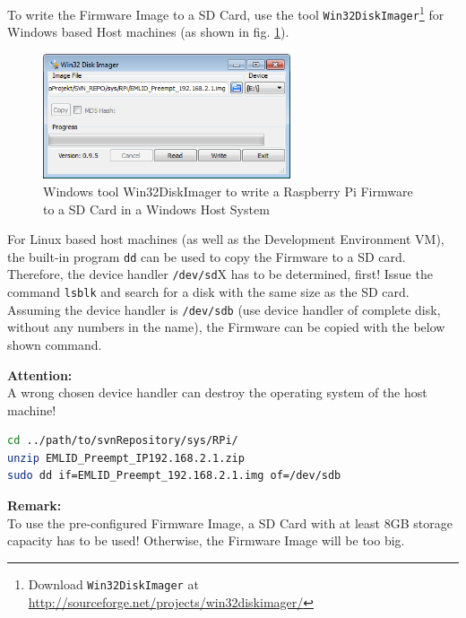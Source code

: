 To write the Firmware Image to a SD Card, use the tool \texttt{Win32DiskImager}\footnote{Download \texttt{Win32DiskImager} at \url{http://sourceforge.net/projects/win32diskimager/}} for Windows based Host machines (as shown in fig. \ref{fig:OS:win32DiskImager}).
\begin{figure}[H]
    \centering
    \includegraphics[width=0.65\textwidth]{fig/ch-rt-linux-os/Win32DiskImager}
    \caption[Windows tool Win32DiskImager]{Windows tool Win32DiskImager to write a Raspberry Pi Firmware to a SD Card in a Windows Host System}
    \label{fig:OS:win32DiskImager}
\end{figure}

For Linux based host machines (as well as the Development Environment VM), the built-in program \texttt{dd} can be used to copy the Firmware to a SD card. Therefore, the device handler \texttt{/dev/sd}X has to be determined, first! Issue the command \texttt{lsblk} and search for a disk with the same size as the SD card.\\
Assuming the device handler is \texttt{/dev/sdb} (use device handler of complete disk, without any numbers in the name), the Firmware can be copied with the below shown command.

\textbf{Attention:}\\
A wrong chosen device handler can destroy the operating system of the host machine!
\begin{lstlisting}[language=bash,otherkeywords={unzip,dd,sudo,of}]
cd ../path/to/svnRepository/sys/RPi/
unzip EMLID_Preempt_IP192.168.2.1.zip
sudo dd if=EMLID_Preempt_192.168.2.1.img of=/dev/sdb
\end{lstlisting}

\textbf{Remark:}\\
To use the pre-configured Firmware Image, a SD Card with at least 8GB storage capacity has to be used! Otherwise, the Firmware Image will be too big.

